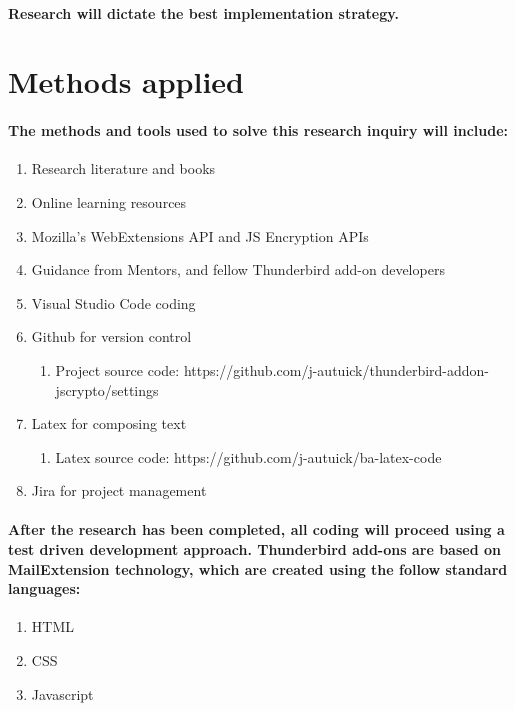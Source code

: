 \paragraph{Research will dictate the best implementation strategy.}

\section{Methods applied}




\paragraph{The methods and tools used to solve this research inquiry will include:}

\begin{enumerate}
\item Research literature and books
\item Online learning resources
\item Mozilla's WebExtensions API and JS Encryption APIs
\item Guidance from Mentors, and fellow Thunderbird add-on developers
\item Visual Studio Code coding
\item Github for version control
\begin{enumerate}
\item Project source code: https://github.com/j-autuick/thunderbird-addon-jscrypto/settings
\end{enumerate}
\item Latex for composing text
\begin{enumerate}
\item Latex source code: https://github.com/j-autuick/ba-latex-code
\end{enumerate}
\item Jira for project management
\end{enumerate}

\paragraph{After the research has been completed, all coding will proceed using a test driven development approach. Thunderbird add-ons are based on MailExtension technology, which are created using the follow standard languages:}

\begin{enumerate}
\item HTML
\item CSS
\item Javascript
\end{enumerate}







